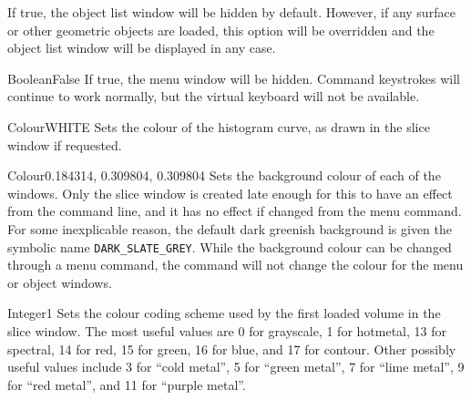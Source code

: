 {If true, the object list window will be hidden by default. However, if any surface or other geometric objects are loaded, this option will be overridden and the object list window will be displayed in any case.}{}

{Boolean}{False}
{If true, the menu window will be hidden. Command keystrokes will continue to work normally, but the virtual keyboard will not be available.}{}

{Colour}{WHITE}
{Sets the colour of the histogram curve, as drawn in the slice window if requested.}{}

{Colour}{0.184314, 0.309804, 0.309804} 
{Sets the background colour of each of the windows. Only
the slice window is created late enough for this to have an effect
from the command line, and it has no effect if changed from the menu
command. For some inexplicable reason, the default dark greenish
background is given the symbolic name {\tt DARK\_SLATE\_GREY}. While the
background colour can be changed through a menu command, the command will not
change the colour for the menu or object windows.}{}




 {Integer}{1} {Sets the
  colour coding scheme used by the first loaded volume in the slice
  window. The most useful values are 0 for grayscale, 1 for hotmetal,
  13 for spectral, 14 for red, 15 for green, 16 for blue, and 17 for
  contour. Other possibly useful values include 3 for ``cold metal'',
  5 for ``green metal'', 7 for ``lime metal'', 9 for ``red metal'',
  and 11 for ``purple metal''.}{}

